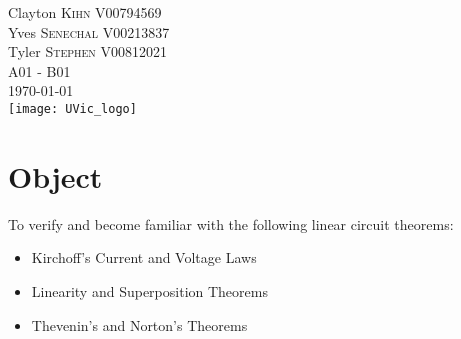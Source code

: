 \documentclass[12pt]{article}
\begin{document}
\begin{titlepage}
\Large Clayton \textsc{Kihn}
\large V00794569	\\
\Large Yves \textsc{Senechal}
\large V00213837	\\
\Large Tyler \textsc{Stephen}
\large V00812021	\\
A01 - B01\\[2.5cm] %


{\large \today}\\[3cm] %


\texttt{[image: UVic\_logo]}\\ %
 

\vfill %

\end{titlepage}

\tableofcontents
\pagebreak

\section{Object}
To verify and become familiar with the following linear circuit theorems:
\begin{itemize}
	\item Kirchoff's Current and Voltage Laws
	\item Linearity and Superposition Theorems
	\item Thevenin's and Norton's Theorems
\end{itemize}
\end{document}
